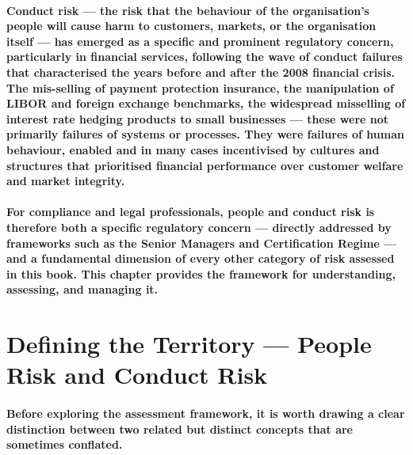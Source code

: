 \paragraph{\textbf{Conduct risk} — the risk that the behaviour of the organisation's people will cause harm to customers, markets, or the organisation itself — has emerged as a specific and prominent regulatory concern, particularly in financial services, following the wave of conduct failures that characterised the years before and after the 2008 financial crisis. The mis-selling of payment protection insurance, the manipulation of LIBOR and foreign exchange benchmarks, the widespread misselling of interest rate hedging products to small businesses — these were not primarily failures of systems or processes. They were failures of human behaviour, enabled and in many cases incentivised by cultures and structures that prioritised financial performance over customer welfare and market integrity.}
\paragraph{For compliance and legal professionals, people and conduct risk is therefore both a specific regulatory concern — directly addressed by frameworks such as the Senior Managers and Certification Regime — and a fundamental dimension of every other category of risk assessed in this book. This chapter provides the framework for understanding, assessing, and managing it.}

\section{Defining the Territory — People Risk and Conduct Risk}
\paragraph{Before exploring the assessment framework, it is worth drawing a clear distinction between two related but distinct concepts that are sometimes conflated.}
